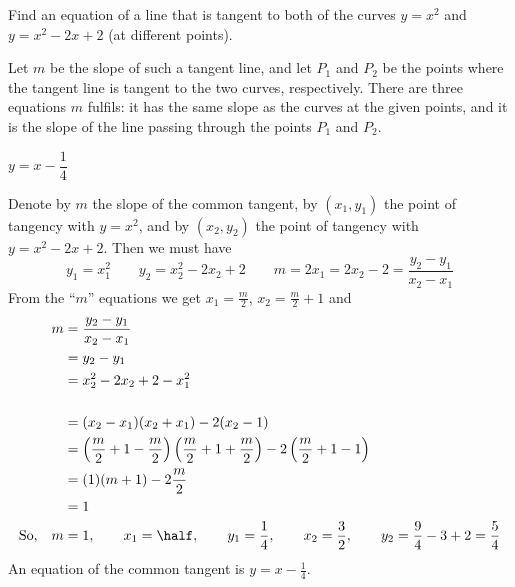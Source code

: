 \begin{question}[2007H]
 Find an equation of a line that is tangent to both of the
curves $y = x^2$ and $y = x^2 - 2x + 2$ (at different points).
\end{question}
\begin{hint}
Let $m$ be the slope of such a tangent line, and let $P_1$ and $P_2$ be the points where the tangent line is tangent to the two curves, respectively. There are three equations $m$ fulfils: it has the same slope as the curves at the given points, and it is the slope of the line passing through the points $P_1$ and $P_2$.
\end{hint}
\begin{answer}
 $y=x-\dfrac{1}{4}$
\end{answer}
\begin{solution}
Denote by $m$ the slope of the common tangent, by $(x_1,y_1)$
the point of tangency with $y=x^2$, and by $(x_2,y_2)$ the point of tangency
with $y=x^2-2x+2$. Then we must have
$$
y_1=x_1^2\qquad
y_2=x_2^2-2x_2+2\qquad
m=2x_1=2x_2-2=\frac{y_2-y_1}{x_2-x_1}
$$
From the ``$m$'' equations we get $x_1=\frac{m}{2}$, $x_2=\frac{m}{2}+1$
and
\begin{align*}
m&=\frac{y_2-y_1}{x_2-x_1}\\
&=y_2-y_1\\
&=x_2^2-2x_2+2-x_1^2\\
\\& =(x_2-x_1)(x_2+x_1)-2(x_2-1)\\
&=\left(\frac{m}{2}+1-\frac{m}{2}\right)\left(\frac{m}{2}+1+\frac{m}{2}\right)
-2\left(\frac{m}{2}+1-1\right)
\\ &=(1)(m+1)-2\frac{m}{2}\\
 &=1\\
\mbox{So,}~~~m&=1,\qquad
x_1=\half,\qquad
y_1=\frac{1}{4},\qquad
x_2=\frac{3}{2},\qquad
y_2=\frac{9}{4}-3+2=\frac{5}{4}
\end{align*}
An equation of the common tangent is $y=x-\frac{1}{4}$.
\end{solution}



